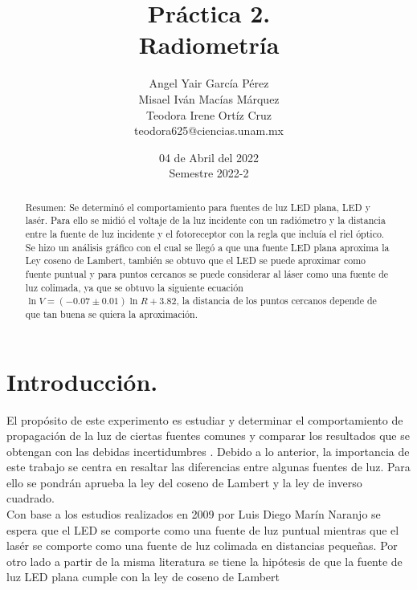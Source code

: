 \documentclass[DIV=calc, paper=a4, fontsize=11pt]{scrartcl}
\title{Práctica 2. \\ %
Radiometría} %
\author{Angel Yair García Pérez \\
Misael Iván Macías Márquez\\
Teodora Irene Ortíz Cruz\\
\small{teodora625@ciencias.unam.mx}\\}
\date{04 de Abril del 2022\\Semestre 2022-2}
\begin{document}
\maketitle
{}
\begin{abstract}

  \textcolor{carmine}{Resumen:} Se determinó el comportamiento para fuentes de luz LED plana, LED y lasér. Para ello se midió el voltaje de la luz incidente con un radiómetro y la distancia entre la fuente de luz incidente y el fotoreceptor con la regla que incluía el riel óptico. Se hizo un análisis gráfico con el cual se llegó a que una fuente LED plana aproxima la Ley coseno de Lambert, también se obtuvo que el LED se puede aproximar como fuente puntual y para puntos cercanos se puede considerar al láser como una fuente de luz colimada, ya que se obtuvo la siguiente ecuación $\ln{V}=(-0.07\pm0.01)\ln{R}+3.82$, la distancia de los puntos cercanos depende de que tan buena se quiera la aproximación.
\end{abstract}
\section*{\textcolor{carmine}{Introducción.}}
El propósito de este experimento es estudiar y determinar el comportamiento de propagación de la luz de ciertas fuentes comunes y comparar los resultados que se obtengan con las debidas incertidumbres \cite{ManualP1}. Debido a lo anterior, la importancia de este trabajo se centra en resaltar las diferencias entre algunas fuentes de luz. Para ello se pondrán aprueba la ley del coseno de Lambert y la ley de inverso cuadrado\cite{Manual}.\\Con base a los estudios realizados en 2009 por Luis Diego Marín Naranjo \cite{Reporte} se espera que  el LED se comporte como una fuente de luz puntual mientras que el lasér se comporte como una fuente de luz colimada en distancias pequeñas. Por otro lado a partir de la misma literatura se tiene la hipótesis de que la fuente de luz LED plana cumple con la ley de coseno de Lambert  
\end{document}
